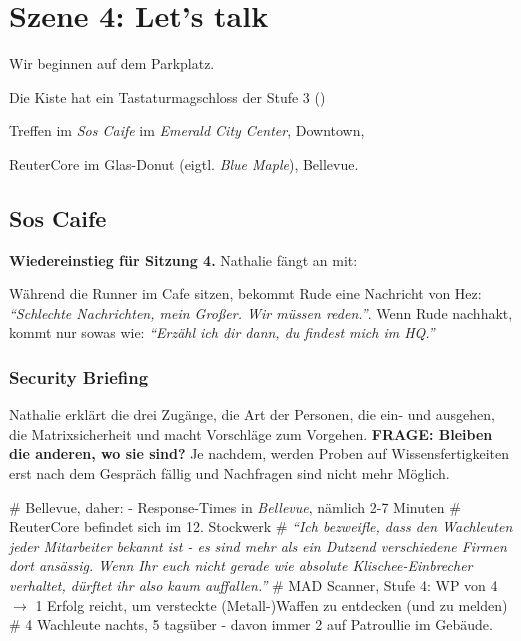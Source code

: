 \section{Szene 4: Let's talk}

Wir beginnen auf dem Parkplatz.

Die Kiste hat ein Tastaturmagschloss der Stufe 3 ()


Treffen im \textit{Sos Caife} im \textit{Emerald City Center}, Downtown, 

ReuterCore im Glas-Donut (eigtl. \textit{Blue Maple}), Bellevue.

\subsection{Sos Caife}

\textbf{Wiedereinstieg für Sitzung 4.} Nathalie fängt an mit:


Während die Runner im Cafe sitzen, bekommt Rude eine Nachricht von Hez: \textit{``Schlechte Nachrichten, mein Großer. Wir müssen reden.''}. Wenn Rude nachhakt, kommt nur sowas wie: \textit{``Erzähl ich dir dann, du findest mich im HQ.''}

\subsubsection{Security Briefing}

Nathalie erklärt die drei Zugänge, die Art der Personen, die ein- und ausgehen, die Matrixsicherheit und macht Vorschläge zum Vorgehen. \textbf{FRAGE: Bleiben die anderen, wo sie sind?} Je nachdem, werden Proben auf Wissensfertigkeiten erst nach dem Gespräch fällig und Nachfragen sind nicht mehr Möglich.

\begin{easylist}
    # Bellevue, daher:  - Response-Times in \textit{Bellevue}, nämlich 2-7 Minuten
    # ReuterCore befindet sich im 12. Stockwerk
    # \textit{``Ich bezweifle, dass den Wachleuten jeder Mitarbeiter bekannt ist - es sind mehr als ein Dutzend verschiedene Firmen dort ansässig. Wenn Ihr euch nicht gerade wie absolute Klischee-Einbrecher verhaltet, dürftet ihr also kaum auffallen.''}
    # MAD Scanner, Stufe 4: WP von 4 $\rightarrow$ 1 Erfolg reicht, um versteckte (Metall-)Waffen zu entdecken (und zu melden)
    # 4 Wachleute nachts, 5 tagsüber - davon immer 2 auf Patroullie im Gebäude.
\end{easylist}

